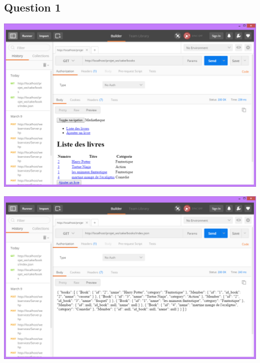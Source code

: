\documentclass{report}
\begin{document}
		\subsection{Question 1}
		\begin{center}
			\includegraphics[scale=0.4]{img/resultats/q1,1.png} 
		\end{center} 
		\begin{center}
			\includegraphics[scale=0.4]{img/resultats/q1,2.png} 
		\end{center}
\end{document}

